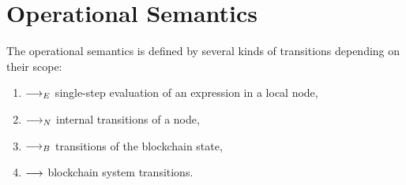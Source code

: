 \documentclass[a4paper]{llncs}
\begin{document}
\section{Operational Semantics}
\label{sec:transitions}

The operational semantics is defined by several kinds of transitions depending on their scope:
\begin{enumerate}
\item $\stackrel{{}}\longrightarrow_E$ single-step evaluation of an expression in a local node,
\item $\stackrel{{}}\longrightarrow_N$ internal transitions of a node,
\item $\stackrel{{}}\longrightarrow_B$ transitions of the blockchain state,
\item $\longrightarrow$ blockchain system transitions.
\end{enumerate}
\end{document}
